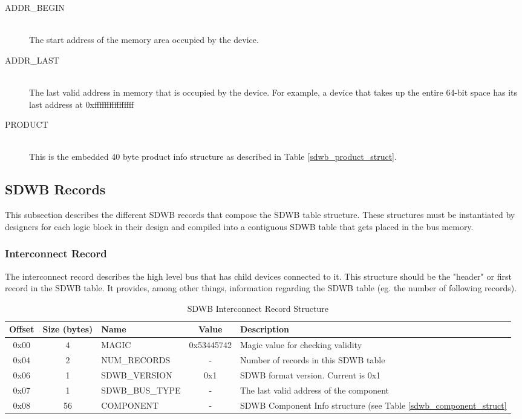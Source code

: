 \documentclass[a4paper, 12pt]{article}
\begin{document}
\begin{description}
\item[ADDR\_BEGIN] \hfill \\
The start address of the memory area occupied by the device.

\item[ADDR\_LAST] \hfill \\
The last valid address in memory that is occupied by the device. For example, a device that takes
up the entire 64-bit space has its last address at 0xffffffffffffffff

\item[PRODUCT] \hfill \\
This is the embedded 40 byte product info structure as described in Table \ref{sdwb_product_struct}.
\end{description}

\subsection{SDWB Records}

This subsection describes the different SDWB records that compose the SDWB table structure. These
structures must be instantiated by designers for each logic block in their design and compiled into
a contiguous SDWB table that gets placed in the bus memory.

\subsubsection{Interconnect Record}

The interconnect record describes the high level bus that has child devices connected to it. This
structure should be the "header" or first record in the SDWB table. It provides, among other things,
information regarding the SDWB table (eg. the number of following records).

\begin{center}
  \begin{savenotes}
    \begin{table}[!ht]\footnotesize
      \caption{SDWB Interconnect Record Structure}\label{sdwb_interconnect_struct}\centering
        \begin{tabular}{| c | c | l | c | p{5cm} |} \hline
        Offset & Size (bytes) & Name & Value & Description \\ \hline
        0x00 & 4 & MAGIC & 0x53445742 & Magic value for checking validity \\ \hline
        0x04 & 2 & NUM\_RECORDS & - & Number of records in this SDWB table \\ \hline
        0x06 & 1 & SDWB\_VERSION & 0x1 & SDWB format version. Current is 0x1 \\ \hline
        0x07 & 1 & SDWB\_BUS\_TYPE & - & The last valid address of the component \\ \hline
        0x08 & 56 & COMPONENT & - & SDWB Component Info structure (see Table \ref{sdwb_component_struct} \\ \hline
        \end{tabular}
    \end{table}
  \end{savenotes}
\end{center}
\end{document}
